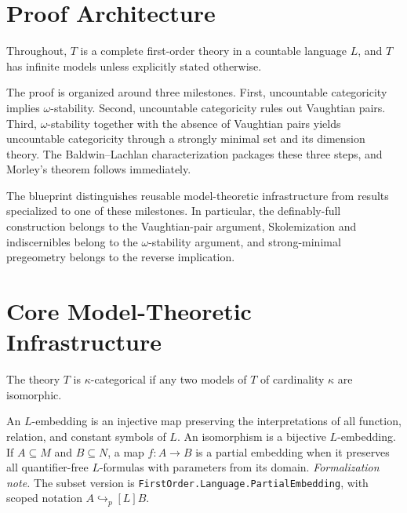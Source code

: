 \section{Proof Architecture}

Throughout, \(T\) is a complete first-order theory in a countable
language \(L\), and \(T\) has infinite models unless explicitly stated
otherwise.

The proof is organized around three milestones.  First, uncountable
categoricity implies \(\omega\)-stability.  Second, uncountable
categoricity rules out Vaughtian pairs.  Third, \(\omega\)-stability
together with the absence of Vaughtian pairs yields uncountable
categoricity through a strongly minimal set and its dimension theory.
The Baldwin--Lachlan characterization packages these three steps, and
Morley's theorem follows immediately.

The blueprint distinguishes reusable model-theoretic infrastructure from
results specialized to one of these milestones.  In particular, the
definably-full construction belongs to the Vaughtian-pair argument,
Skolemization and indiscernibles belong to the \(\omega\)-stability
argument, and strong-minimal pregeometry belongs to the reverse
implication.

\section{Core Model-Theoretic Infrastructure}

\begin{definition}
\label{def:categoricity}
\mathlibok
The theory \(T\) is \(\kappa\)-categorical if any two models of \(T\)
of cardinality \(\kappa\) are isomorphic.
\end{definition}

\begin{definition}
\label{def:embeddings}
\leanok
An \(L\)-embedding is an injective map preserving the interpretations of
all function, relation, and constant symbols of \(L\).  An isomorphism
is a bijective \(L\)-embedding.  If \(A\subseteq M\) and \(B\subseteq N\),
a map \(f:A\to B\) is a partial embedding when it preserves all
quantifier-free \(L\)-formulas with parameters from its domain.
\emph{Formalization note.}  The subset version is
\texttt{FirstOrder.Language.PartialEmbedding}, with scoped notation
\(A\hookrightarrow_{\!p}[L] B\).
\end{definition}

